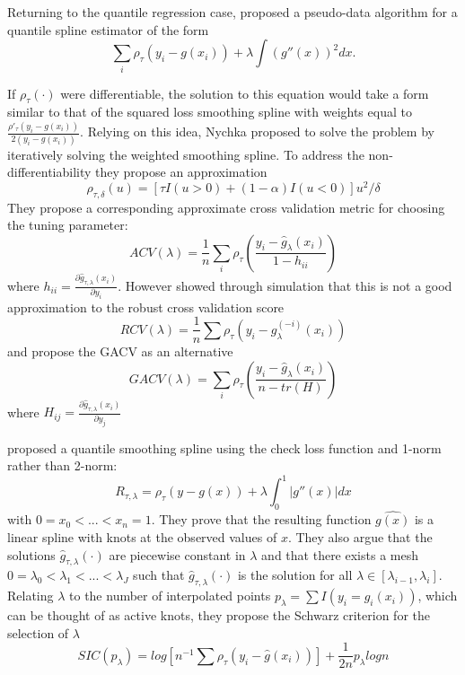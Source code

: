 \documentclass[12pt]{article}
\numberwithin{equation}{section}
\theoremstyle{plain}
\begin{document}
Returning to the quantile regression case, \cite{nychka1995nonparametric} proposed a pseudo-data algorithm for a quantile spline estimator of the form 
\begin{equation}
 \sum_i \rho_{\tau}(y_i - g(x_i)) + \lambda\int(g''(x))^2dx.
\end{equation}

If $\rho_{\tau}(\cdot)$ were differentiable, the solution to this equation would take a form similar to that of the squared loss smoothing spline with weights equal to $\frac{\rho'_{\tau}(y_i-g(x_i))}{2(y_i - g(x_i))}$. Relying on this idea, Nychka proposed to solve the problem by iteratively solving the weighted smoothing spline. To address the non-differentiability they propose an approximation 
\begin{equation}
\rho_{\tau, \delta}(u) = [\tau I(u>0) + (1-\alpha)I(u<0)]u^2/\delta
\end{equation}
They propose a corresponding approximate cross validation metric for choosing the tuning parameter:
\begin{equation}
ACV(\lambda) = \frac{1}{n}\sum_i \rho_{\tau}\left(\frac{y_i - \widehat{g}_\lambda(x_i)}{1-h_{ii}}\right)
\end{equation}
where $h_{ii} = \frac{\partial\widehat{g}_{\tau, \lambda}(x_i)}{\partial y_i}$. However \cite{yuan2006gacv} showed through simulation that this is not a good approximation to the robust cross validation score
\begin{equation}
RCV(\lambda) = \frac{1}{n}\sum\rho_{\tau}(y_i - g_\lambda^{(-i)}(x_i))
\end{equation}
and propose the GACV as an alternative 
\begin{equation}
GACV(\lambda) = \sum_i \rho_{\tau}\left(\frac{y_i - \widehat{g}_\lambda(x_i)}{n-tr(H)}\right)
\end{equation}
where $H_{ij} = \frac{\partial\widehat{g}_{\tau, \lambda}(x_i)}{\partial y_j}$ 

\cite{KoenkerNgPortnoy1994} proposed a quantile smoothing spline using the check loss function and 1-norm rather than 2-norm:
\begin{equation}
R_{\tau,\lambda} = \rho_{\tau}(y - g(x)) + \lambda\int_0^1|g''(x)|dx
\end{equation}
with $0 = x_0 < ... < x_n = 1$. They prove that the resulting function $\widehat{g(x)}$ is a linear spline with knots at the observed values of $x$. They also argue that the solutions $\widehat{g}_{\tau,\lambda}(\cdot)$ are piecewise constant in $\lambda$ and that there exists a mesh $0= \lambda_0 < \lambda_1 < ... < \lambda_J$ such that $\widehat{g}_{\tau,\lambda}(\cdot)$ is the solution for all $\lambda \in [\lambda_{i-1}, \lambda_i]$. Relating $\lambda$ to the number of interpolated points $p_{\lambda} = \sum I(y_i = \widehat{g}_i(x_i))$, which can be thought of as active knots, they propose the Schwarz criterion for the selection of $\lambda$
\begin{equation}
SIC(p_{\lambda}) = log[n^{-1}\sum\rho_{\tau}(y_i - \widehat{g}(x_i))] + \frac{1}{2n}p_{\lambda}log n
\end{equation}



\end{document}
